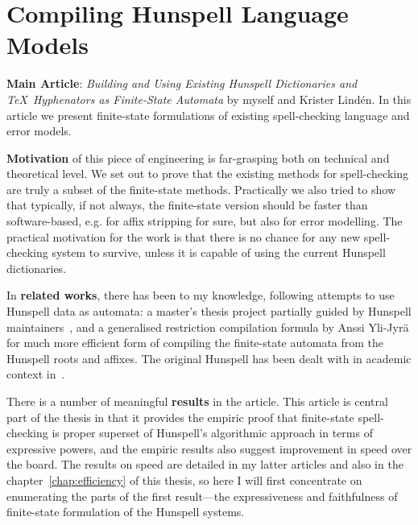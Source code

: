 \documentclass[officiallayout]{unihelcompling}
\begin{document}
\section{Compiling Hunspell Language Models}
\label{sec:Hunspell}

\textbf{Main Article}: \emph{Building and Using Existing Hunspell Dictionaries
and \TeX\ Hyphenators as Finite-State Automata} by myself and Krister Lindén.
In this article we present finite-state formulations of existing spell-checking
language and error models.

\textbf{Motivation} of this piece of engineering is far-grasping both on 
technical and theoretical level. We set out to prove that the existing
methods for spell-checking are truly a subset of the finite-state methods.
Practically we also tried to show that typically, if not always, the 
finite-state version should be faster than software-based, e.g. for affix
stripping for sure, but also for error modelling. The practical motivation
for the work is that there is no chance for any new spell-checking system to
survive, unless it is capable of using the current Hunspell dictionaries.

In \textbf{related works}, there has been to my knowledge, following
attempts to use Hunspell data as automata: a master's thesis project partially
guided by Hunspell maintainers~\citep{greenfield2010open}, and a generalised
restriction compilation formula by Anssi Yli-Jyrä for much more efficient form
of compiling the finite-state automata from the Hunspell roots and affixes. The
original Hunspell has been dealt with in academic context 
in~\citet{tron2005hunmorph}.

There is a number of meaningful \textbf{results} in the article. This article
is central part of the thesis in that it provides the empiric proof that
finite-state spell-checking is proper superset of Hunspell's algorithmic 
approach in terms of expressive powers, and the empiric results also suggest
improvement in speed over the board. The results on speed are detailed in my
latter articles and also in the chapter~\ref{chap:efficiency} of this thesis,
so here I will first concentrate on enumerating the parts of the first
result---the expressiveness and faithfulness of finite-state formulation of
the Hunspell systems.
\end{document}
